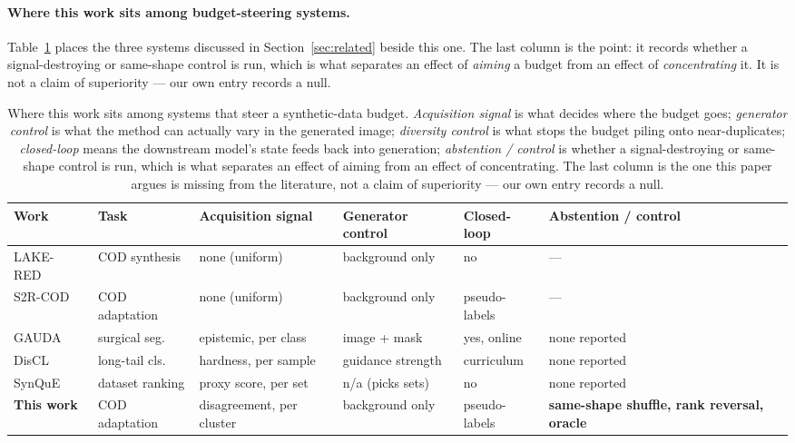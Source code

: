 \documentclass{article} %
\begin{document}
\paragraph{Where this work sits among budget-steering systems.} Table~\ref{tab:closest} places the
three systems discussed in Section~\ref{sec:related} beside this one. The last column is the point:
it records whether a signal-destroying or same-shape control is run, which is what separates an
effect of \emph{aiming} a budget from an effect of \emph{concentrating} it. It is not a claim of
superiority --- our own entry records a null.

\begin{table}[t]
\caption{Where this work sits among systems that steer a synthetic-data budget. \emph{Acquisition
signal} is what decides where the budget goes; \emph{generator control} is what the method can
actually vary in the generated image; \emph{diversity control} is what stops the budget piling onto
near-duplicates; \emph{closed-loop} means the downstream model's state feeds back into generation;
\emph{abstention / control} is whether a signal-destroying or same-shape control is run, which is
what separates an effect of aiming from an effect of concentrating. The last column is the one this
paper argues is missing from the literature, not a claim of superiority --- our own entry records a
null.}
\label{tab:closest}
\begin{center}
\small
\setlength{\tabcolsep}{3pt}
\footnotesize
\begin{tabular}{@{}lp{1.75cm}p{1.9cm}p{1.75cm}p{1.35cm}p{1.9cm}@{}}
\toprule
Work & Task & Acquisition signal & Generator control & Closed-loop & Abstention / control \\
\midrule
LAKE-RED~\cite{zhao2024lakered} & COD synthesis & none (uniform) & background only & no & --- \\
S2R-COD~\cite{luo2025s2rcod} & COD adaptation & none (uniform) & background only & pseudo-labels & --- \\
GAUDA~\cite{frisch2025gauda} & surgical seg. & epistemic, per class & image + mask & yes, online & none reported \\
DisCL~\cite{liang2025discl} & long-tail cls. & hardness, per sample & guidance strength & curriculum & none reported \\
SynQuE~\cite{chen2025synque} & dataset ranking & proxy score, per set & n/a (picks sets) & no & none reported \\
\midrule
\textbf{This work} & COD adaptation & disagreement, per cluster & background only & pseudo-labels &
\textbf{same-shape shuffle, rank reversal, oracle} \\
\bottomrule
\end{tabular}
\end{center}
\end{table}
\end{document}
